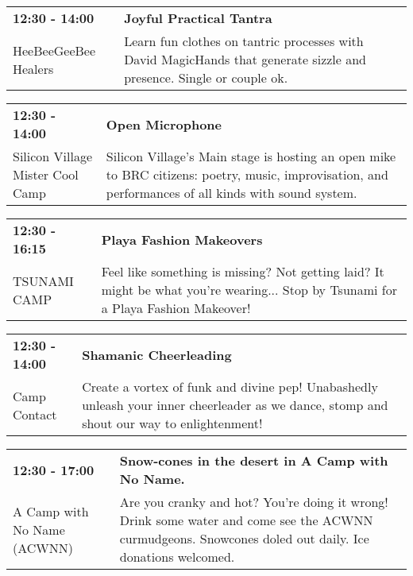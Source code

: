 \begin{tabular}{ p{1in} p{2.2in} }
    \textbf{12:30 - 14:00} & \textbf{Joyful Practical Tantra} \\
    HeeBeeGeeBee Healers \newline  & Learn fun clothes on tantric processes with David MagicHands that generate sizzle and presence. Single or couple ok. \\
    \hline 
\end{tabular}
    
\begin{tabular}{ p{1in} p{2.2in} }
    \textbf{12:30 - 14:00} & \textbf{Open Microphone} \\
    Silicon Village \newline Mister Cool Camp & Silicon Village's Main stage is hosting an open mike to BRC citizens: poetry, music, improvisation, and performances of all kinds with sound system. \\
    \hline 
\end{tabular}
    
\begin{tabular}{ p{1in} p{2.2in} }
    \textbf{12:30 - 16:15} & \textbf{Playa Fashion Makeovers} \\
    TSUNAMI CAMP \newline  & Feel like something is missing?  Not getting laid?  It might be what you're wearing...  Stop by Tsunami for a Playa Fashion Makeover! \\
    \hline 
\end{tabular}
    
\begin{tabular}{ p{1in} p{2.2in} }
    \textbf{12:30 - 14:00} & \textbf{Shamanic Cheerleading} \\
    Camp Contact \newline  & Create a vortex of funk and divine pep! Unabashedly unleash your inner cheerleader as we dance, stomp and shout our way to enlightenment! \\
    \hline 
\end{tabular}
    
\begin{tabular}{ p{1in} p{2.2in} }
    \textbf{12:30 - 17:00} & \textbf{Snow-cones in the desert in A Camp with No Name.} \\
    A Camp with No Name (ACWNN) \newline  & Are you cranky and hot? You're doing it wrong! Drink some water and come see the ACWNN curmudgeons. Snowcones doled out daily. Ice donations welcomed. \\
    \hline 
\end{tabular}
    
